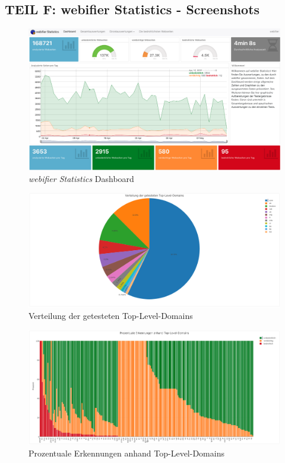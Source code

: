 \begin{landscape}

\section*{TEIL F: webifier Statistics - Screenshots}
\label{app:f}

\begin{figure}[H]
  \centering
  \includegraphics[width=\textheight]{images/stats/dashboard}
  \caption{\textit{webifier Statistics} Dashboard}
\end{figure}

\begin{figure}[H]
  \centering
  \includegraphics[width=\textheight]{images/stats/tldverteilung}
  \caption{Verteilung der getesteten Top-Level-Domains}
\end{figure}


\begin{figure}[H]
  \centering
  \includegraphics[width=\textheight]{images/stats/tldprozentual}
  \caption{Prozentuale Erkennungen anhand Top-Level-Domains}
\end{figure}



\end{landscape}
